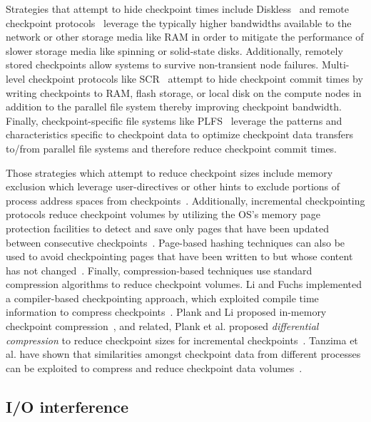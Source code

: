 Strategies that attempt to hide checkpoint times include
Diskless~\cite{Plank98Diskless} and remote checkpoint
protocols~\cite{Cornwell11RemoteBLCR,Stellner96CoCheck,Zandy99ProcessHijacking}
leverage the typically higher bandwidths available to the network or other
storage media like RAM in order to mitigate the performance of slower storage
media like spinning or solid-state disks. Additionally, remotely stored
checkpoints allow systems to survive non-transient node failures. Multi-level
checkpoint  protocols like SCR~\cite{Moody10SCR,Vaidya95TwoLevel} attempt to
hide checkpoint commit times by writing checkpoints to RAM, flash storage, or
local disk on the compute nodes in addition to the parallel file system thereby
improving checkpoint bandwidth.  Finally, checkpoint-specific file systems like
PLFS~\cite{Bent09PLFS} leverage the patterns and characteristics specific to
checkpoint data to optimize checkpoint data transfers to/from parallel file
systems and therefore reduce checkpoint commit times.

Those strategies which attempt to reduce checkpoint sizes include memory
exclusion which leverage user-directives or other hints to exclude portions of
process address spaces from checkpoints~\cite{Plank99MemoryExclusion}.
Additionally, incremental checkpointing protocols reduce checkpoint volumes by
utilizing the OS's memory page protection facilities to detect and save only
pages that have been updated between consecutive
checkpoints~\cite{Bronevetsky09Compiler,
Chen97CLIP,Elnozahy92ConsistentCheckpointing,Li94ConcurrentCheckpointing,
Plank94Libckpt,Paun10IncrementalWeibull,Kiswany08stdchk}.  Page-based hashing
techniques can also be used to avoid checkpointing pages that have been written
to but whose content has not changed~\cite{Ferreira11Libhashckpt}.  Finally,
compression-based techniques use standard compression algorithms to reduce
checkpoint volumes.  Li and Fuchs implemented a compiler-based checkpointing
approach, which exploited compile time information to compress
checkpoints~\cite{Li90CATCH}.  Plank and Li proposed in-memory checkpoint
compression~\cite{Plank94ICKP}, and related, Plank et al. proposed
\textit{differential compression} to reduce checkpoint sizes for incremental
checkpoints~\cite{Plank95CompressedDiff}.  Tanzima et al. have shown that
similarities amongst checkpoint data from different processes can be exploited
to compress and reduce checkpoint data volumes~\cite{tanzima12mcrengine}.

\subsection{I/O interference}

